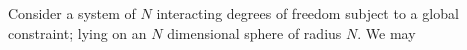 Consider a system of $N$ interacting degrees of freedom subject to a global constraint; lying on an $N$ dimensional sphere of radius $N$. We may 